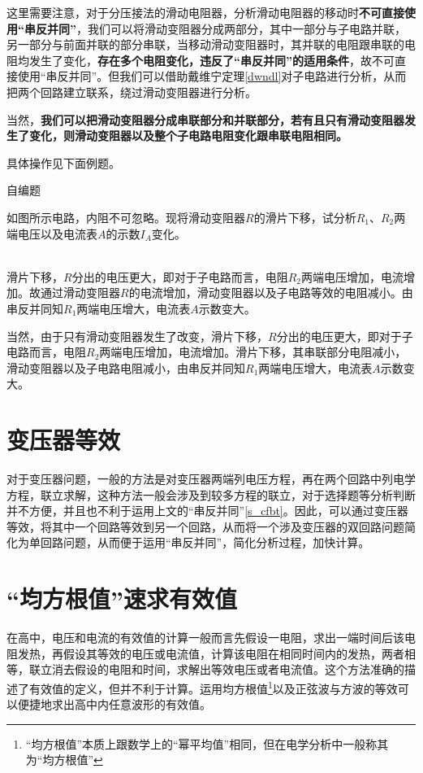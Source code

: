 这里需要注意，对于分压接法的滑动电阻器，分析滑动电阻器的移动时\textbf{不可直接使用“串反并同”}，我们可以将滑动变阻器分成两部分，其中一部分与子电路并联，另一部分与前面并联的部分串联，当移动滑动变阻器时，其并联的电阻跟串联的电阻均发生了变化，\textbf{存在多个电阻变化，违反了“串反并同”的适用条件}，故不可直接使用“串反并同”。但我们可以借助戴维宁定理\eqref{dwndl}对子电路进行分析，从而把两个回路建立联系，绕过滑动变阻器进行分析。

当然，\textbf{我们可以把滑动变阻器分成串联部分和并联部分，若有且只有滑动变阻器发生了变化，则滑动变阻器以及整个子电路电阻变化跟串联电阻相同。}

具体操作见下面例题。

\begin{ep}{自编题}{}

如图所示电路，内阻不可忽略。现将滑动变阻器$R$的滑片下移，试分析$R_1$、$R_2$两端电压以及电流表$A$的示数$I_A$变化。

~\\
滑片下移，$R$分出的电压更大，即对于子电路而言，电阻$R_2$两端电压增加，电流增加。故通过滑动变阻器$R$的电流增加，滑动变阻器以及子电路等效的电阻减小。由串反并同知$R_1$两端电压增大，电流表$A$示数变大。

当然，由于只有滑动变阻器发生了改变，滑片下移，$R$分出的电压更大，即对于子电路而言，电阻$R_2$两端电压增加，电流增加。滑片下移，其串联部分电阻减小，滑动变阻器以及子电路电阻减小，由串反并同知$R_1$两端电压增大，电流表$A$示数变大。

\end{ep}

\section{变压器等效}

对于变压器问题，一般的方法是对变压器两端列电压方程，再在两个回路中列电学方程，联立求解，这种方法一般会涉及到较多方程的联立，对于选择题等分析判断并不方便，并且也不利于运用上文的“串反并同”\eqref{s_cfbt}。因此，可以通过变压器等效，将其中一个回路等效到另一个回路，从而将一个涉及变压器的双回路问题简化为单回路问题，从而便于运用“串反并同”，简化分析过程，加快计算。

\section{“均方根值”速求有效值}

在高中，电压和电流的有效值的计算一般而言先假设一电阻，求出一端时间后该电阻发热，再假设其等效的电压或电流值，计算该电阻在相同时间内的发热，两者相等，联立消去假设的电阻和时间，求解出等效电压或者电流值。这个方法准确的描述了有效值的定义，但并不利于计算。运用均方根值\footnote{“均方根值”本质上跟数学上的“幂平均值”相同，但在电学分析中一般称其为“均方根值”}以及正弦波与方波的等效可以便捷地求出高中内任意波形的有效值。

